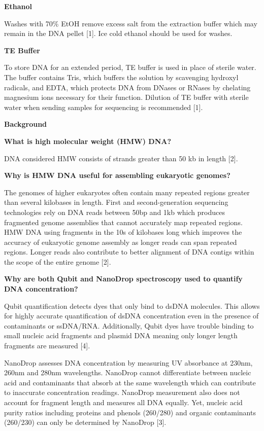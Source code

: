 \documentclass[
]{book}
\begin{document}
\textbf{Ethanol}~

Washes with 70\% EtOH remove excess salt from the extraction buffer which may remain in the DNA pellet {[}1{]}. Ice cold ethanol should be used for washes.~

\textbf{TE Buffer}~

To store DNA for an extended period, TE buffer is used in place of sterile water. The buffer contains Tris, which buffers the solution by scavenging hydroxyl radicals, and EDTA, which protects DNA from DNases or RNases by chelating magnesium ions necessary for their function. Dilution of TE buffer with sterile water when sending samples for sequencing is recommended {[}1{]}.~

\textbf{Background}~

\textbf{What is high molecular weight (HMW) DNA?}~

DNA considered HMW consists of strands greater than 50 kb in length {[}2{]}.~

\textbf{Why is HMW DNA useful for assembling eukaryotic genomes?}~

The genomes of higher eukaryotes often contain many repeated regions greater than several kilobases in length. First and second-generation sequencing technologies rely on DNA reads between 50bp and 1kb which produces fragmented genome assemblies that cannot accurately map repeated regions. HMW DNA using fragments in the 10s of kilobases long which improves the accuracy of eukaryotic genome assembly as longer reads can span repeated regions. Longer reads also contribute to better alignment of DNA contigs within the scope of the entire genome {[}2{]}.~

\textbf{Why are both Qubit and NanoDrop spectroscopy used to quantify DNA concentration?}~

Qubit quantification detects dyes that only bind to dsDNA molecules. This allows for highly accurate quantification of dsDNA concentration even in the presence of contaminants or ssDNA/RNA. Additionally, Qubit dyes have trouble binding to small nucleic acid fragments and plasmid DNA meaning only longer length fragments are measured {[}4{]}.~

NanoDrop assesses DNA concentration by measuring UV absorbance at 230nm, 260nm and 280nm wavelengths. NanoDrop cannot differentiate between nucleic acid and contaminants that absorb at the same wavelength which can contribute to inaccurate concentration readings. NanoDrop measurement also does not account for fragment length and measures all DNA equally. Yet, nucleic acid purity ratios including proteins and phenols (260/280) and organic contaminants (260/230) can only be determined by NanoDrop {[}3{]}.~
\end{document}
